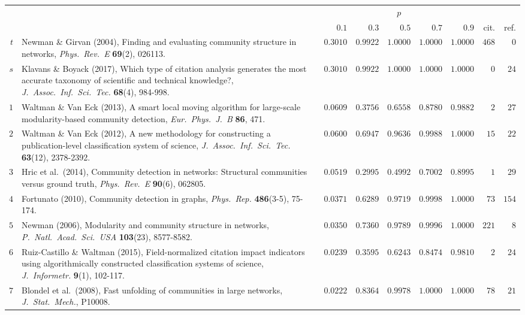 \documentclass{article}
\theoremstyle{definition}
\begin{document}
\begin{table}%
  \begin{tabular}{rp{14cm}rrrrrrr}\toprule
    & & \multicolumn{5}{c}{$p$} \\\cmidrule{3-7}
    & & $0.1$ & $0.3$ & $0.5$ & $0.7$ & $0.9$ & cit. & ref. \\\midrule
    $t$ & Newman \& Girvan (2004), Finding and evaluating community structure in networks, {\it Phys.\ Rev.\ E} {\bf 69}(2), 026113. & $0.3010$ & $0.9922$ & $1.0000$ & $1.0000$ & $1.0000$ & $468$ & $0$ \\
    $s$ & Klavans \& Boyack (2017), Which type of citation analysis generates the most accurate taxonomy of scientific and technical knowledge?, {\it J.\ Assoc.\ Inf.\ Sci.\ Tec.} {\bf 68}(4), 984-998. & $0.3010$ & $0.9922$ & $1.0000$ & $1.0000$ & $1.0000$ & $0$ & $24$ \\\midrule
    $1$ & Waltman \& Van Eck (2013), A smart local moving algorithm for large-scale modularity-based community detection, {\it Eur.\ Phys.\ J.\ B} {\bf 86}, 471. & $0.0609$ & $0.3756$ & $0.6558$ & $0.8780$ & $0.9882$ & $2$ & $27$ \\
    $2$ & Waltman \& Van Eck (2012), A new methodology for constructing a publication-level classification system of science, {\it J.\ Assoc.\ Inf.\ Sci.\ Tec.} {\bf 63}(12), 2378-2392. & $0.0600$ & $0.6947$ & $0.9636$ & $0.9988$ & $1.0000$ & $15$ & $22$ \\
    $3$ & Hric et al.\ (2014), Community detection in networks: Structural communities versus ground truth, {\it Phys.\ Rev.\ E} {\bf 90}(6), 062805. & $0.0519$ & $0.2995$ & $0.4992$ & $0.7002$ & $0.8995$ & $1$ & $29$ \\
    $4$ & Fortunato (2010), Community detection in graphs, {\it Phys.\ Rep.} {\bf 486}(3-5), 75-174. & $0.0371$ & $0.6289$ & $0.9719$ & $0.9998$ & $1.0000$ & $73$ & $154$ \\
    $5$ & Newman (2006), Modularity and community structure in networks, {\it P.\ Natl.\ Acad.\ Sci.\ USA} {\bf 103}(23), 8577-8582. & $0.0350$ & $0.7360$ & $0.9789$ & $0.9996$ & $1.0000$ & $221$ & $8$ \\
    $6$ & Ruiz-Castillo \& Waltman (2015), Field-normalized citation impact indicators using algorithmically constructed classification systems of science, {\it J.\ Informetr.} {\bf 9}(1), 102-117. & $0.0239$ & $0.3595$ & $0.6243$ & $0.8474$ & $0.9810$ & $2$ & $24$ \\
    $7$ & Blondel et al.\ (2008), Fast unfolding of communities in large networks, {\it J.\ Stat.\ Mech.}, P10008. & $0.0222$ & $0.8364$ & $0.9978$ & $1.0000$ & $1.0000$ & $78$ & $21$ \\

\end{tabular}
\end{table}
\end{document}
